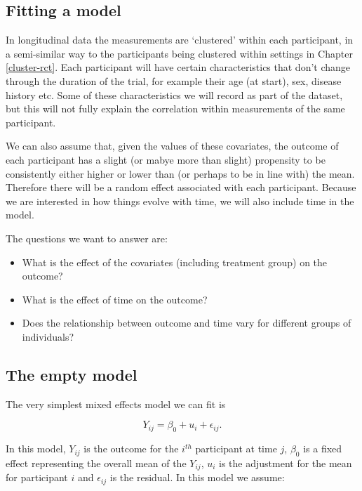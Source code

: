 \documentclass[
  openany]{book}
\providecommand{\tightlist}{%
  \setlength{\itemsep}{0pt}\setlength{\parskip}{0pt}}
\theoremstyle{definition}
\theoremstyle{definition}
\theoremstyle{definition}
\theoremstyle{definition}
\theoremstyle{remark}
\begin{document}
\hypertarget{fitting-a-model}{%
\subsection{Fitting a model}\label{fitting-a-model}}

In longitudinal data the measurements are `clustered' within each participant, in a semi-similar way to the participants being clustered within settings in Chapter \ref{cluster-rct}. Each participant will have certain characteristics that don't change through the duration of the trial, for example their age (at start), sex, disease history etc. Some of these characteristics we will record as part of the dataset, but this will not fully explain the correlation within measurements of the same participant.

We can also assume that, given the values of these covariates, the outcome of each participant has a slight (or mabye more than slight) propensity to be consistently either higher or lower than (or perhaps to be in line with) the mean. Therefore there will be a random effect associated with each participant. Because we are interested in how things evolve with time, we will also include time in the model.

The questions we want to answer are:

\begin{itemize}
\tightlist
\item
  What is the effect of the covariates (including treatment group) on the outcome?
\item
  What is the effect of time on the outcome?
\item
  Does the relationship between outcome and time vary for different groups of individuals?
\end{itemize}

\hypertarget{the-empty-model}{%
\subsection{The empty model}\label{the-empty-model}}

The very simplest mixed effects model we can fit is

\begin{equation}
Y_{ij} = \beta_0 + u_{i} + \epsilon_{ij}.
\label{eq:lmer0}
\end{equation}

In this model, \(Y_{ij}\) is the outcome for the \(i^{th}\) participant at time \(j\), \(\beta_0\) is a fixed effect representing the overall mean of the \(Y_{ij}\), \(u_i\) is the adjustment for the mean for participant \(i\) and \(\epsilon_{ij}\) is the residual. In this model we assume:
\end{document}
